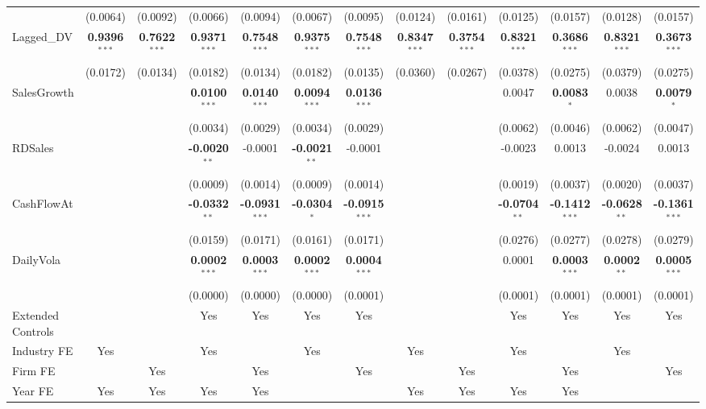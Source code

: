 \begin{landscape}
\begin{table}[H]
\begin{tabular}{lcccccccccccc}
 & (0.0064) & (0.0092) & (0.0066) & (0.0094) & (0.0067) & (0.0095) & (0.0124) & (0.0161) & (0.0125) & (0.0157) & (0.0128) & (0.0157) \\
Lagged\_DV & \textbf{0.9396}$^{***}$ & \textbf{0.7622}$^{***}$ & \textbf{0.9371}$^{***}$ & \textbf{0.7548}$^{***}$ & \textbf{0.9375}$^{***}$ & \textbf{0.7548}$^{***}$ & \textbf{0.8347}$^{***}$ & \textbf{0.3754}$^{***}$ & \textbf{0.8321}$^{***}$ & \textbf{0.3686}$^{***}$ & \textbf{0.8321}$^{***}$ & \textbf{0.3673}$^{***}$ \\
 & (0.0172) & (0.0134) & (0.0182) & (0.0134) & (0.0182) & (0.0135) & (0.0360) & (0.0267) & (0.0378) & (0.0275) & (0.0379) & (0.0275) \\
SalesGrowth &  &  & \textbf{0.0100}$^{***}$ & \textbf{0.0140}$^{***}$ & \textbf{0.0094}$^{***}$ & \textbf{0.0136}$^{***}$ &  &  & 0.0047 & \textbf{0.0083}$^{*}$ & 0.0038 & \textbf{0.0079}$^{*}$ \\
 &  &  & (0.0034) & (0.0029) & (0.0034) & (0.0029) &  &  & (0.0062) & (0.0046) & (0.0062) & (0.0047) \\
RDSales &  &  & \textbf{-0.0020}$^{**}$ & -0.0001 & \textbf{-0.0021}$^{**}$ & -0.0001 &  &  & -0.0023 & 0.0013 & -0.0024 & 0.0013 \\
 &  &  & (0.0009) & (0.0014) & (0.0009) & (0.0014) &  &  & (0.0019) & (0.0037) & (0.0020) & (0.0037) \\
CashFlowAt &  &  & \textbf{-0.0332}$^{**}$ & \textbf{-0.0931}$^{***}$ & \textbf{-0.0304}$^{*}$ & \textbf{-0.0915}$^{***}$ &  &  & \textbf{-0.0704}$^{**}$ & \textbf{-0.1412}$^{***}$ & \textbf{-0.0628}$^{**}$ & \textbf{-0.1361}$^{***}$ \\
 &  &  & (0.0159) & (0.0171) & (0.0161) & (0.0171) &  &  & (0.0276) & (0.0277) & (0.0278) & (0.0279) \\
DailyVola &  &  & \textbf{0.0002}$^{***}$ & \textbf{0.0003}$^{***}$ & \textbf{0.0002}$^{***}$ & \textbf{0.0004}$^{***}$ &  &  & 0.0001 & \textbf{0.0003}$^{***}$ & \textbf{0.0002}$^{**}$ & \textbf{0.0005}$^{***}$ \\
 &  &  & (0.0000) & (0.0000) & (0.0000) & (0.0001) &  &  & (0.0001) & (0.0001) & (0.0001) & (0.0001) \\
\midrule
Extended Controls &  &  & Yes & Yes & Yes & Yes &  &  & Yes & Yes & Yes & Yes \\
Industry FE & Yes &  & Yes &  & Yes &  & Yes &  & Yes &  & Yes &  \\
Firm FE &  & Yes &  & Yes &  & Yes &  & Yes &  & Yes &  & Yes \\
Year FE & Yes & Yes & Yes & Yes &  &  & Yes & Yes & Yes & Yes &  &  \\

\end{tabular}
\end{table}
\end{landscape}
